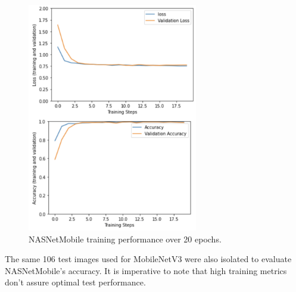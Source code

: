\documentclass[conference]{IEEEtran}
\begin{document}
\begin{figure}[h]
\centerline{\includegraphics[height=10cm, width = .9\linewidth]{Images/Screen Shot 2021-05-10 at 4.36.35 PM.pdf}}
\caption{NASNetMobile training performance over 20 epochs. }
\label{NNMStats}
\end{figure}

The same 106 test images used for MobileNetV3 were also isolated to evaluate NASNetMobile's accuracy. It is imperative to note that high training metrics don't assure optimal test performance. %

\end{document}
